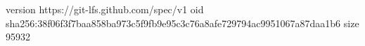 version https://git-lfs.github.com/spec/v1
oid sha256:38f06f3f7baa858ba973c5f9fb9e95c3c76a8afe729794ac9951067a87daa1b6
size 95932

